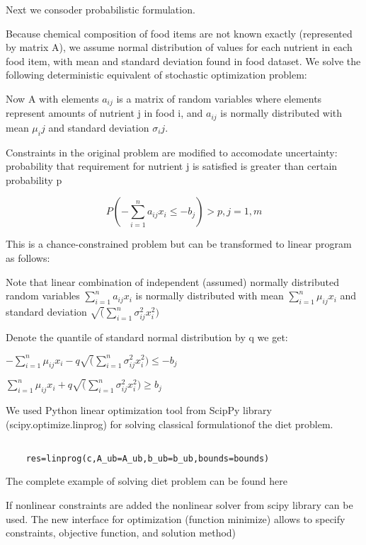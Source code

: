 Next we consoder probabilistic formulation.

Because chemical composition of food items are not known exactly (represented by matrix A), we assume normal distribution of values for each nutrient in each food item, with mean and standard deviation found in food dataset. We solve the following deterministic equivalent of stochastic optimization problem:

Now A with elements $a_{ij}$ is a matrix of random variables where elements represent amounts of nutrient j in food i, and $a_{ij}$ is normally distributed with mean $\mu_ij$ and standard deviation $\sigma_ij$. 


Constraints in the original problem are modified to accomodate uncertainty: probability that requirement for nutrient j is satisfied is greater than certain probability p 

   \begin{equation} %
  P(  -\sum_{i=1}^{n}{a_{ij}x_i}\le - b_j) >p, j=1,m
    \end{equation}

This is a chance-constrained problem but can be transformed to linear program as follows:

Note that linear combination  of independent (assumed) normally distributed random variables $\sum_{i=1}^{n}{a_{ij}x_i}$ is normally distributed with mean  $\sum_{i=1}^{n}{\mu_{ij}x_i}$  and standard deviation  $\sqrt (\sum_{i=1}^{n}{\sigma_{ij}^2x_i^2})$ 

Denote the quantile of standard normal distribution by q we get:

$-\sum_{i=1}^{n}{\mu_{ij}x_i}-q \sqrt (\sum_{i=1}^{n}{\sigma_{ij}^2x_i^2}) \le -b_j$ 

$\sum_{i=1}^{n}{\mu_{ij}x_i}+q \sqrt (\sum_{i=1}^{n}{\sigma_{ij}^2x_i^2}) \ge b_j$ 


We used Python linear optimization tool  from ScipPy library (scipy.optimize.linprog) for solving classical formulationof the diet problem.


\begin{verbatim}

    res=linprog(c,A_ub=A_ub,b_ub=b_ub,bounds=bounds)

\end{verbatim}

The complete example of solving diet problem can be found here \cite{diet}

 If nonlinear constraints are added the nonlinear solver from scipy library can be used. The new interface for optimization (function minimize) allows to specify constraints, objective function, and solution method)





